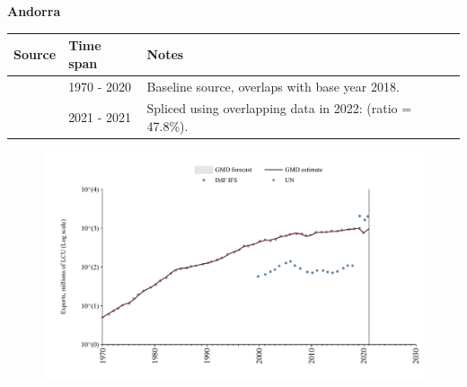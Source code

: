 \documentclass[12pt,a4paper,landscape]{article}
\begin{document}
\begin{adjustbox}{max totalsize={\paperwidth}{\paperheight},center}
\begin{minipage}[t][\textheight][t]{\textwidth}
\vspace*{0.5cm}
{}
\begin{center}
{\Large\bfseries Andorra}
\end{center}
\vspace{0.5cm}
\begin{table}[H]
\centering
\small
\begin{tabular}{|l|l|l|}
\hline
\textbf{Source} & \textbf{Time span} & \textbf{Notes} \\
\hline
\rowcolor{white}\cite{UN}& 1970 - 2020 &Baseline source, overlaps with base year 2018.\\
\rowcolor{lightgray}\cite{IMF_IFS}& 2021 - 2021 &Spliced using overlapping data in 2022: (ratio = 47.8\%).\\
\hline
\end{tabular}
\end{table}
\begin{figure}[H]
\centering
\includegraphics[width=\textwidth,height=0.6\textheight,keepaspectratio]{graphs/AND_exports.pdf}
\end{figure}
\end{minipage}
\end{adjustbox}
\end{document}
